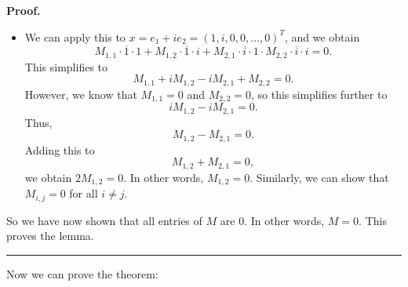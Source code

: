 \documentclass[numbers=enddot,12pt,final,onecolumn,notitlepage]{scrartcl}%
\numberwithin{exer}{subsection}
\theoremstyle{definition}
\newenvironment{proof}[1][Proof]{\noindent\textbf{#1.} }{\ \rule{0.5em}{0.5em}}
\begin{document}
\begin{proof}
\begin{itemize}
\item We can apply this to $x=e_{1}+ie_{2}=\left(  1,i,0,0,\ldots,0\right)
^{T}$, and we obtain
\[
M_{1,1}\cdot\overline{1}\cdot1+M_{1,2}\cdot\overline{1}\cdot i+M_{2,1}%
\cdot\overline{i}\cdot1\cdot M_{2,2}\cdot\overline{i}\cdot i=0.
\]
This simplifies to%
\[
M_{1,1}+iM_{1,2}-iM_{2,1}+M_{2,2}=0.
\]
However, we know that $M_{1,1}=0$ and $M_{2,2}=0$, so this simplifies further
to%
\[
iM_{1,2}-iM_{2,1}=0.
\]
Thus,
\[
M_{1,2}-M_{2,1}=0.
\]
Adding this to%
\[
M_{1,2}+M_{2,1}=0,
\]
we obtain $2M_{1,2}=0$. In other words, $M_{1,2}=0$. Similarly, we can show
that $M_{i,j}=0$ for all $i\neq j$.
\end{itemize}

So we have now shown that all entries of $M$ are $0$. In other words, $M=0$.
This proves the lemma.
\end{proof}

Now we can prove the theorem:
\end{document}
